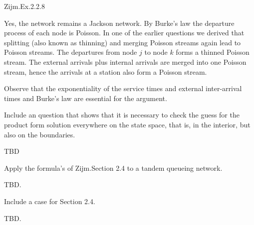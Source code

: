 \begin{question}
Zijm.Ex.2.2.8
\begin{solution}
  Yes, the network remains a Jackson network. By Burke's law the
  departure process of each node is Poisson. In one of the earlier
  questions we derived that splitting (also known as thinning) and
  merging Poisson streams again lead to Poisson streams. The
  departures from node $j$ to node $k$ forms a thinned Poisson
  stream. The external arrivals plus internal arrivals are merged into
  one Poisson stream, hence the arrivals at a station also form a Poisson stream.

  Observe that the exponentiality of the service times and external
  inter-arrival times and Burke's law are essential for the argument.
\end{solution}
\end{question}

\begin{question}[use=false]
  Include an question that shows that it is necessary to check the
  guess for the product form solution everywhere on the state space,
  that is, in the interior, but also on the boundaries.
  \begin{solution}
    TBD
  \end{solution}
\end{question}

\begin{question}[use=false]
  Apply the formula's of Zijm.Section 2.4 to a tandem queueing network.
  \begin{solution}
    TBD.
  \end{solution}
\end{question}

\begin{question}[use=false]
  Include a case for Section 2.4.
  \begin{solution}
    TBD.
  \end{solution}
\end{question}
